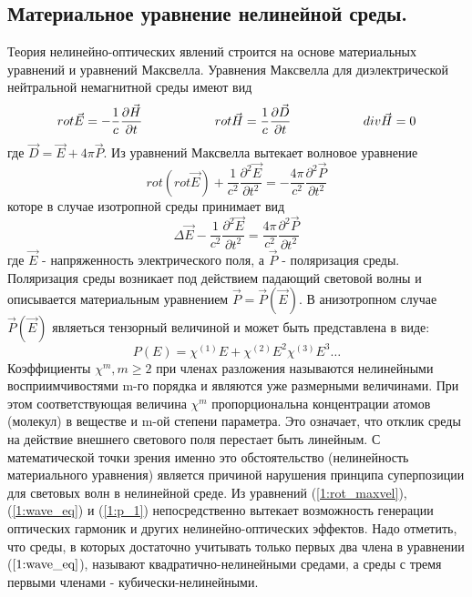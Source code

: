 \subsection{Материальное уравнение нелинейной среды.} 
\hspace*{2mm}Теория нелинейно-оптических явлений строится на основе материальных уравнений и уравнений
Максвелла. Уравнения Максвелла для диэлектрической нейтральной немагнитной среды имеют вид
\begin{equation}\label{1:maxvel}
rot\vec{E} = - \frac{ 1 }{ c}\frac{\partial \vec{H} }{\partial t}
\hspace{20mm}
rot\vec{H} =  \frac{ 1 }{ c}\frac{\partial \vec{D} }{\partial t}
\hspace{20mm}
div\vec{H} = 0
\end{equation}
где $ \vec{D} = \vec{E} + 4\pi \vec{P}$. Из уравнений Максвелла вытекает волновое уравнение
\begin{equation}\label{1:rot_maxvel}
rot(rot\vec{E}) + \frac{ 1 }{ c^2 }\frac{\partial^2 \vec{E} }{\partial t^2} = - \frac{ 4\pi }{ c^2 }\frac{\partial^2 \vec{P} }{\partial t^2}
\end{equation}
которе в случае изотропной среды принимает вид
\begin{equation}\label{1:wave_eq}
\Delta\vec{E} - \frac{ 1 }{ c^2 }\frac{\partial^2 \vec{E} }{\partial t^2} =  \frac{ 4\pi }{ c^2 }\frac{\partial^2 \vec{P} }{\partial t^2}
\end{equation}
где $\vec{E}$ - напряженность электрического поля, а $\vec{P}$ - поляризация среды. Поляризация среды возникает под действием падающий световой волны и описывается материальным уравнением $\vec{P} = \vec{P}(\vec{E})$.
В анизотропном случае $\vec{P}(\vec{E})$ являеться тензорный величиной и может быть представлена в виде:
\begin{equation}\label{1:p_1}
P(E) = \chi^{(1)}E + \chi^{(2)}E^2 \chi^{(3)}E^3\dots
\end{equation}
Коэффициенты $\chi^{m}, m \ge 2$ при членах разложения называются нелинейными восприимчивостями m-го порядка и являются уже размерными величинами. При этом соответствующая величина $\chi^{m}$ пропорциональна концентрации атомов (молекул) в веществе и m-ой степени параметра. Это означает, что отклик среды на действие внешнего светового поля перестает быть линейным.  С математической точки зрения именно это обстоятельство (нелинейность материального уравнения) является причиной нарушения принципа суперпозиции для световых волн в нелинейной среде. Из уравнений (\ref{1:rot_maxvel}), (\ref{1:wave_eq}) и (\ref{1:p_1}) непосредственно вытекает возможность генерации оптических гармоник и других нелинейно-оптических эффектов.  Надо отметить, что среды, в которых достаточно учитывать только первых два члена в уравнении ($\ref{1:wave_eq}$), называют квадратично-нелинейными средами, а среды с тремя первыми членами - кубически-нелинейными. 
